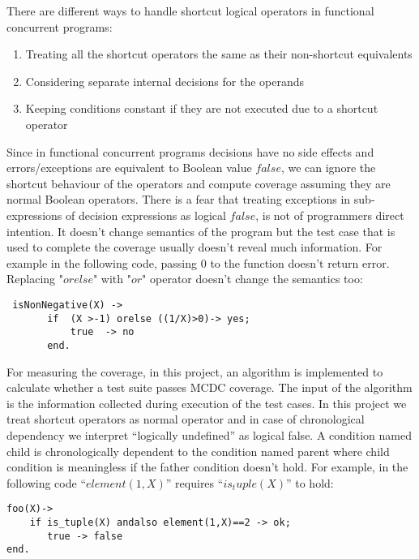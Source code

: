 \documentclass[12pt,a4paper]{report}
\begin{document}
There are different ways to handle shortcut logical operators in functional concurrent programs:

\begin{enumerate}
 \item Treating all the shortcut operators the same as their non-shortcut equivalents
 \item Considering separate internal decisions for the operands\cite{DO-248B} 
 \item Keeping conditions constant if they are not executed due to a shortcut operator\cite{chilenski1994applicability}
\end{enumerate}
 
Since in functional concurrent programs decisions have no side effects and errors/exceptions are equivalent to Boolean value $false$, we can ignore the
 shortcut behaviour of the operators and compute coverage assuming they are normal Boolean operators. There is a fear that treating exceptions in
 sub-expressions of decision expressions as logical $false$, is not of programmers direct intention. It doesn’t change semantics of the program but
 the test case that is used to complete the coverage usually doesn’t reveal much information. For example in the following code, passing $0$ to the
 function doesn’t return error. Replacing "$orelse$" with "$or$" operator doesn’t change the semantics too:

\begin{lstlisting}
 isNonNegative(X) -> 
       if  (X >-1) orelse ((1/X)>0)-> yes;
           true  -> no
       end.
\end{lstlisting} 
 
For measuring the coverage, in this project, an algorithm is implemented to calculate whether a test suite passes MCDC coverage. The input of the algorithm
 is the information collected during execution of the test cases. In this project we treat shortcut operators as normal operator and in case of
 chronological dependency we interpret “logically undefined” as logical false. A condition named child is chronologically dependent to the condition named
 parent where child condition is meaningless if the father condition doesn’t hold. For example, in the following code “$element(1,X)$” requires
 “$is_tuple(X)$” to hold:

\begin{lstlisting}
foo(X)->
    if is_tuple(X) andalso element(1,X)==2 -> ok;
       true -> false
end.
\end{lstlisting} 
\end{document}
